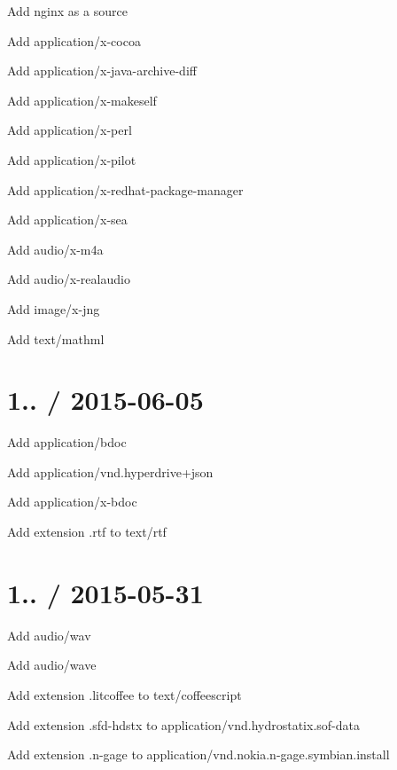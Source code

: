 \begin{DoxyItemize}
\item Add nginx as a source
\item Add {\ttfamily application/x-\/cocoa}
\item Add {\ttfamily application/x-\/java-\/archive-\/diff}
\item Add {\ttfamily application/x-\/makeself}
\item Add {\ttfamily application/x-\/perl}
\item Add {\ttfamily application/x-\/pilot}
\item Add {\ttfamily application/x-\/redhat-\/package-\/manager}
\item Add {\ttfamily application/x-\/sea}
\item Add {\ttfamily audio/x-\/m4a}
\item Add {\ttfamily audio/x-\/realaudio}
\item Add {\ttfamily image/x-\/jng}
\item Add {\ttfamily text/mathml}
\end{DoxyItemize}

\section*{1.. / 2015-\/06-\/05 }


\begin{DoxyItemize}
\item Add {\ttfamily application/bdoc}
\item Add {\ttfamily application/vnd.\+hyperdrive+json}
\item Add {\ttfamily application/x-\/bdoc}
\item Add extension {\ttfamily .rtf} to {\ttfamily text/rtf}
\end{DoxyItemize}

\section*{1.. / 2015-\/05-\/31 }


\begin{DoxyItemize}
\item Add {\ttfamily audio/wav}
\item Add {\ttfamily audio/wave}
\item Add extension {\ttfamily .litcoffee} to {\ttfamily text/coffeescript}
\item Add extension {\ttfamily .sfd-\/hdstx} to {\ttfamily application/vnd.\+hydrostatix.\+sof-\/data}
\item Add extension {\ttfamily .n-\/gage} to {\ttfamily application/vnd.\+nokia.\+n-\/gage.\+symbian.\+install}
\end{DoxyItemize}


